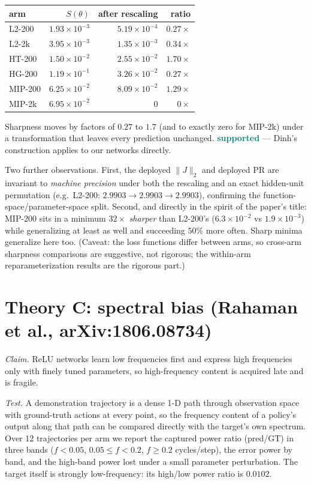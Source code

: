 \documentclass[10pt]{article}
\newcommand{\yes}{\textcolor{teal}{\textbf{supported}}}
\begin{document}
\begin{center}\small
\begin{tabular}{lrrr}
\toprule
arm & $S(\theta)$ & after rescaling & ratio \\
\midrule
L2-200  & $1.93\times10^{-3}$ & $5.19\times10^{-4}$ & $0.27\times$ \\
L2-2k   & $3.95\times10^{-3}$ & $1.35\times10^{-3}$ & $0.34\times$ \\
HT-200  & $1.50\times10^{-2}$ & $2.55\times10^{-2}$ & $1.70\times$ \\
HG-200  & $1.19\times10^{-1}$ & $3.26\times10^{-2}$ & $0.27\times$ \\
MIP-200 & $6.25\times10^{-2}$ & $8.09\times10^{-2}$ & $1.29\times$ \\
MIP-2k  & $6.95\times10^{-2}$ & $0$                 & $0\times$ \\
\bottomrule
\end{tabular}
\end{center}

Sharpness moves by factors of $0.27$ to $1.7$ (and to exactly zero for
MIP-2k) under a transformation that leaves every prediction unchanged.
\yes{} --- Dinh's construction applies to our networks directly.

Two further observations. First, the deployed $\|J\|_2$ and deployed PR
are invariant to \emph{machine precision} under both the rescaling and an
exact hidden-unit permutation (e.g.\ L2-200: $2.9903 \to 2.9903 \to
2.9903$), confirming the function-space/parameter-space split.
Second, and directly in the spirit of the paper's title: MIP-200 sits in a
minimum $32\times$ \emph{sharper} than L2-200's ($6.3\times10^{-2}$ vs
$1.9\times10^{-3}$) while generalizing at least as well and succeeding
$50\%$ more often. Sharp minima generalize here too. (Caveat: the loss
functions differ between arms, so cross-arm sharpness comparisons are
suggestive, not rigorous; the within-arm reparameterization results are
the rigorous part.)

\section{Theory C: spectral bias (Rahaman et al., arXiv:1806.08734)}

\emph{Claim.} ReLU networks learn low frequencies first and express high
frequencies only with finely tuned parameters, so high-frequency content
is acquired late and is fragile.

\emph{Test.} A demonstration trajectory is a dense 1-D path through
observation space with ground-truth actions at every point, so the
frequency content of a policy's output along that path can be compared
directly with the target's own spectrum. Over 12 trajectories per arm we
report the captured power ratio (pred/GT) in three bands
($f<0.05$, $0.05\le f<0.2$, $f\ge0.2$ cycles/step), the error power by
band, and the high-band power lost under a small parameter perturbation.
The target itself is strongly low-frequency: its high/low power ratio is
$0.0102$.
\end{document}
